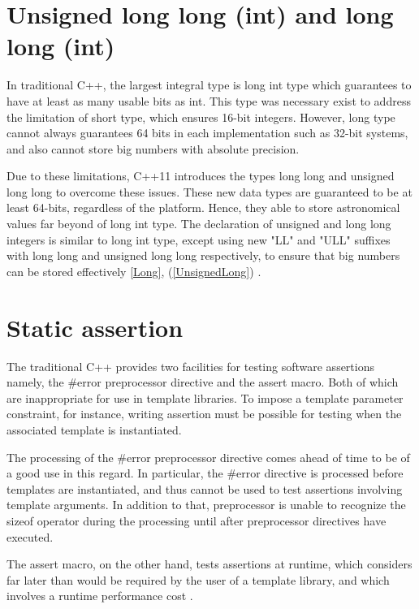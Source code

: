 \documentclass[11pt]{report}
\begin{document}
\section{Unsigned long long (int) and long long (int)}
\label{section: Unsigned and long long (int)}
In traditional C++, the largest integral type is long int type which guarantees to have at least as many usable bits as int.  This type was necessary exist to address the limitation of short type, which ensures 16-bit integers. However, long type cannot always guarantees 64 bits in each implementation such as 32-bit systems, and also cannot store big numbers with absolute precision.


 Due to these limitations, C++11 introduces the types long long and unsigned long long to overcome these issues. These new data types are guaranteed to be at least 64-bits, regardless of the platform. Hence, they able to store astronomical values far beyond of long int type. The declaration of unsigned and long long integers is similar to long int type, except using new "LL" and "ULL" suffixes with long long and unsigned long long respectively, to ensure that big numbers can be stored effectively \ref{Long}, (\ref{UnsignedLong}) \cite{Overland:2011:CWF}.

\section{Static assertion}
\label{section: Static assertion}
The traditional C++ provides two facilities for testing software assertions namely, the \#error preprocessor directive and the assert macro. Both of which are inappropriate for use in template libraries.  To impose a template parameter constraint, for instance, writing assertion must be possible for testing when the associated template is instantiated.


The processing of the \#error preprocessor directive comes ahead of time to be of a good use in this regard. In particular, the \#error directive is processed before templates are instantiated, and thus cannot be used to test assertions involving template arguments. In addition to that, preprocessor is unable to recognize the sizeof operator during the processing until after preprocessor directives have executed.


The assert macro, on the other hand, tests assertions at runtime, which considers far later than would be required by the user of a template library, and which involves a runtime performance cost \cite{Stroustrup:2012:Cpp11}.
\end{document}
